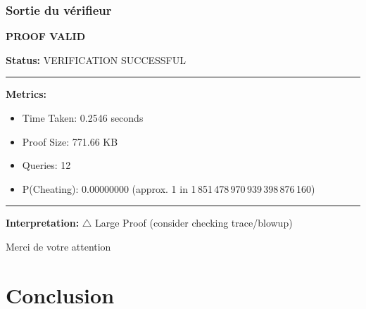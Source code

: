 \documentclass{beamer}
\begin{document}
\begin{frame}[fragile]
\frametitle{Sortie du vérifieur}

\begin{center}
    {\color{green!40!black}\Huge\sffamily\bfseries PROOF VALID}
\end{center}

\vspace{2mm}
\textbf{Status:} \textcolor{green!40!black}{VERIFICATION SUCCESSFUL}
\hrule
\vspace{1mm}
\textbf{Metrics:}
\begin{itemize}
    \item Time Taken: 0.2546 seconds
    \item Proof Size: 771.66 KB
    \item Queries: 12
    \item P(Cheating): 0.00000000 (approx. 1 in 1\,851\,478\,970\,939\,398\,876\,160)
\end{itemize}
\vspace{1mm}
\hrule
\vspace{1mm}
\textbf{Interpretation:} \textcolor{orange!80!black}{$\bigtriangleup$} Large Proof (consider checking trace/blowup)

\end{frame}

\begin{frame}
\vfill
\begin{center}
    {\Huge Merci de votre attention}
\end{center}
\vfill
\end{frame}

\section{Conclusion}
\end{document}
